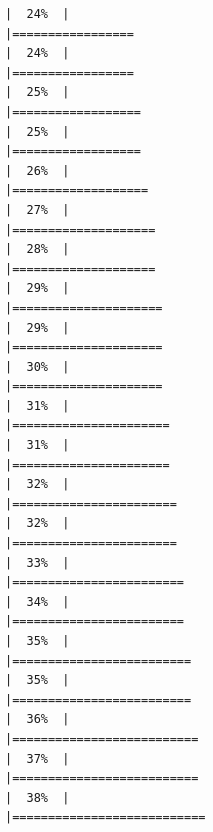 \documentclass[
  english,
  man,a4paper,mask,floatsintext]{apa6}
\begin{document}
\begin{verbatim}
|  24%  |                                                                              |=================                                                     |  24%  |                                                                              |=================                                                     |  25%  |                                                                              |==================                                                    |  25%  |                                                                              |==================                                                    |  26%  |                                                                              |===================                                                   |  27%  |                                                                              |====================                                                  |  28%  |                                                                              |====================                                                  |  29%  |                                                                              |=====================                                                 |  29%  |                                                                              |=====================                                                 |  30%  |                                                                              |=====================                                                 |  31%  |                                                                              |======================                                                |  31%  |                                                                              |======================                                                |  32%  |                                                                              |=======================                                               |  32%  |                                                                              |=======================                                               |  33%  |                                                                              |========================                                              |  34%  |                                                                              |========================                                              |  35%  |                                                                              |=========================                                             |  35%  |                                                                              |=========================                                             |  36%  |                                                                              |==========================                                            |  37%  |                                                                              |==========================                                            |  38%  |                                                                              |===========================                                           
\end{verbatim}
\end{document}
